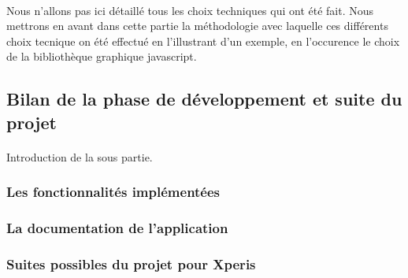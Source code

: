 			\paragraph{}%
			Nous n'allons pas ici détaillé tous les choix techniques qui ont été fait.
			Nous mettrons en avant dans cette partie la méthodologie avec laquelle ces
			différents choix tecnique on été effectué en l'illustrant d'un exemple, en
			l'occurence le choix de la bibliothèque graphique javascript.
	
	\subsection{Bilan de la phase de développement et suite du projet}
		\paragraph{}
		Introduction de la sous partie.
		
		\subsubsection{Les fonctionnalités implémentées}
		\subsubsection{La documentation de l'application}
			\paragraph{}%
			\paragraph{}%
			\paragraph{}%
		\subsubsection{Suites possibles du projet pour Xperis}